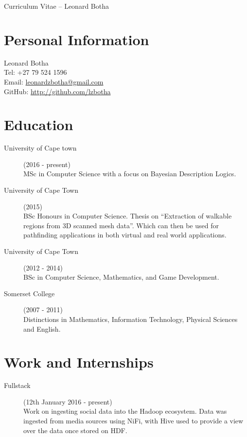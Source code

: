 \documentclass[margin,line,a4paper]{resume}
\begin{document}
    {\sc \Large Curriculum Vitae -- Leonard Botha}
    \begin{resume}
        \vspace{0.5cm}

        \section{\mysidestyle Personal Information}
            Leonard Botha\\
            Tel: +27 79 524 1596\\
            Email: \href{mailto:leonardzbotha@gmail.com}{leonardzbotha@gmail.com}\\
            GitHub: \href{http://github.com/lzbotha}{http://github.com/lzbotha}\\

        \section{\mysidestyle Education}
            \begin{description}
                \item[University of Cape town] (2016 - present)\\
                    MSc in Computer Science with a focus on Bayesian Description Logics.

                \item[University of Cape Town] (2015) \\
                    BSc Honours in Computer Science. Thesis on ``Extraction of  walkable regions from 3D scanned mesh data''.
                    Which can then be used for pathfinding applications in both virtual and real world applications.

                \item[University of Cape Town] (2012 - 2014) \\
                    BSc in Computer Science, Mathematics, and Game Development.

                \item[Somerset College](2007 - 2011)\\
                    Distinctions in Mathematics, Information Technology, Physical Sciences and English.
            \end{description}


        \section{\mysidestyle Work and Internships}
            \begin{description}
                \item[Fullstack] (12th January 2016 - present) \\
                    Work on ingesting social data into the Hadoop ecosystem. Data was ingested from media sources using NiFi, with Hive used to provide a view over the data once stored on HDF.


\end{description}
\end{resume}
\end{document}
